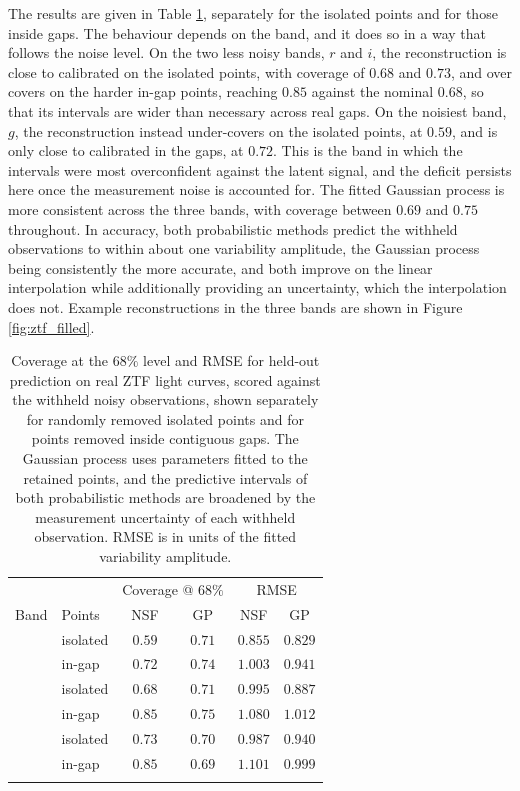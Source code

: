 The results are given in Table \ref{tab:realztf}, separately for the isolated points and for those inside gaps. The behaviour depends on the band, and it does so in a way that follows the noise level. On the two less noisy bands, $r$ and $i$, the reconstruction is close to calibrated on the isolated points, with coverage of $0.68$ and $0.73$, and over covers on the harder in-gap points, reaching $0.85$ against the nominal $0.68$, so that its intervals are wider than necessary across real gaps. On the noisiest band, $g$, the reconstruction instead under-covers on the isolated points, at $0.59$, and is only close to calibrated in the gaps, at $0.72$. This is the band in which the intervals were most overconfident against the latent signal, and the deficit persists here once the measurement noise is accounted for. The fitted Gaussian process is more consistent across the three bands, with coverage between $0.69$ and $0.75$ throughout. In accuracy, both probabilistic methods predict the withheld observations to within about one variability amplitude, the Gaussian process being consistently the more accurate, and both improve on the linear interpolation while additionally providing an uncertainty, which the interpolation does not. Example reconstructions in the three bands are shown in Figure \ref{fig:ztf_filled}.

\begin{table}[H]
\centering
\caption[Held-out prediction on real ZTF light curves]{\label{tab:realztf} Coverage at the $68\%$ level and RMSE for held-out prediction on real ZTF light curves, scored against the withheld noisy observations, shown separately for randomly removed isolated points and for points removed inside contiguous gaps. The Gaussian process uses parameters fitted to the retained points, and the predictive intervals of both probabilistic methods are broadened by the measurement uncertainty of each withheld observation. RMSE is in units of the fitted variability amplitude.}
\begin{tabular}{llcccc}
\hline
\noalign{\smallskip}
& & \multicolumn{2}{c}{Coverage @ $68\%$} & \multicolumn{2}{c}{RMSE} \\
\noalign{\smallskip}
Band & Points & NSF & GP & NSF & GP \\
\noalign{\smallskip}
\hline
\noalign{\smallskip}
\multirow{2}{*}{$g$} & isolated & $0.59$ & $0.71$ & $0.855$ & $0.829$ \\
                     & in-gap   & $0.72$ & $0.74$ & $1.003$ & $0.941$ \\
\noalign{\smallskip}
\multirow{2}{*}{$r$} & isolated & $0.68$ & $0.71$ & $0.995$ & $0.887$ \\
                     & in-gap   & $0.85$ & $0.75$ & $1.080$ & $1.012$ \\
\noalign{\smallskip}
\multirow{2}{*}{$i$} & isolated & $0.73$ & $0.70$ & $0.987$ & $0.940$ \\
                     & in-gap   & $0.85$ & $0.69$ & $1.101$ & $0.999$ \\
\noalign{\smallskip}
\hline
\end{tabular}
\end{table}

